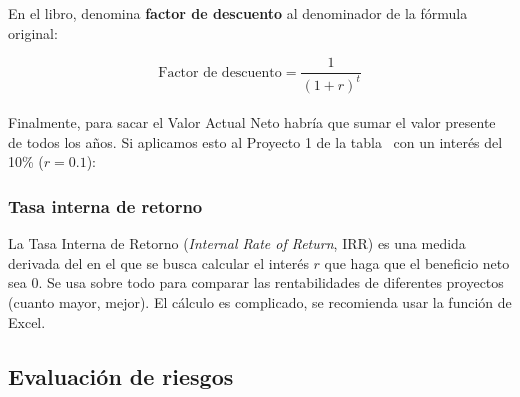\documentclass[12pt]{article}
\begin{document}
{En el libro, denomina \textbf{factor de descuento} al denominador de la fórmula original:}

\begin{equation}
    \text{Factor de descuento} = \frac{1}{(1+r)^t}
\end{equation} \\

{Finalmente, para sacar el Valor Actual Neto habría que sumar el valor presente de todos los años. Si aplicamos esto al Proyecto 1 de la tabla~ con un interés del 10\% ($r = 0.1$):}

\begin{table}[ht]
\centering
{}
\caption{Valor Actual Neto}
\label{tab:2.2}
\end{table}

\newpage
\subsubsection{Tasa interna de retorno}
\label{2.5.5}

{La Tasa Interna de Retorno (\textit{Internal Rate of Return}, IRR) es una medida derivada del  en el que se busca calcular el interés $r$ que haga que el beneficio neto sea 0. Se usa sobre todo para comparar las rentabilidades de diferentes proyectos (cuanto mayor, mejor). El cálculo es complicado, se recomienda usar la función de Excel.}

\subsection{Evaluación de riesgos}
\label{2.6.0}
\end{document}
